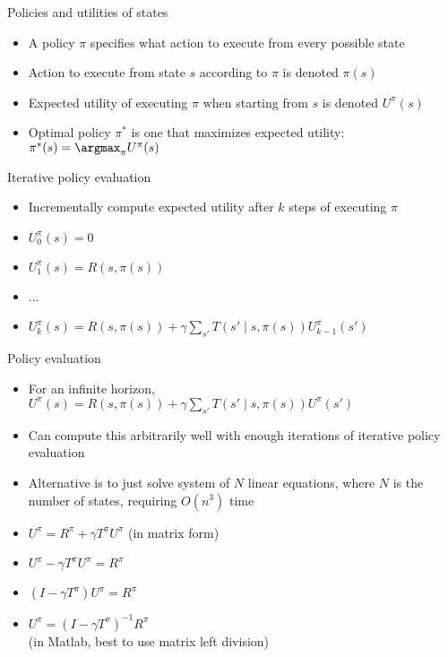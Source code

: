 \documentclass[handout]{dmu}
\begin{document}
\begin{frame}{Policies and utilities of states}
\begin{itemize}
\item<1-> A \alert<1>{policy} $\pi$ specifies what action to execute from every possible state
\item<2-> Action to execute from state $s$ according to $\pi$ is denoted $\pi(s)$
\item<3-> Expected utility of executing $\pi$ when starting from $s$ is denoted $U^\pi(s)$
\item<4-> Optimal policy $\pi^*$ is one that maximizes expected utility: $\pi^*(s) = \argmax_\pi U^\pi(s)$
\end{itemize}
\end{frame}
\clearfoot

\begin{frame}{Iterative policy evaluation}
\begin{itemize}
\item<1-> Incrementally compute expected utility after $k$ steps of executing $\pi$
\item<2-> $U_0^\pi(s) = 0$
\item<3-> $U_1^\pi(s) = R(s, \pi(s))$
\item<4-> ...
\item<5-> $U_k^\pi(s) = R(s, \pi(s)) + \gamma \sum_{s'} T(s' \mid s, \pi(s)) U_{k-1}^\pi(s')$
\end{itemize}
\vfill
{}
\end{frame}

\begin{frame}{Policy evaluation}
\begin{itemize}
\item<1-> For an infinite horizon,\\$U^\pi(s) = R(s, \pi(s)) + \gamma \sum_{s'} T(s' \mid s, \pi(s)) U^\pi(s')$
\item<2-> Can compute this arbitrarily well with enough iterations of iterative policy evaluation
\item<3-> Alternative is to just solve system of $N$ linear equations, where $N$ is the number of states, requiring $O(n^3)$ time
\item<4-> $U^\pi = R^\pi + \gamma T^\pi U^\pi$ (in matrix form)
\item<5-> $U^\pi - \gamma T^\pi U^\pi = R^\pi$
\item<6-> $(I - \gamma T^\pi) U^\pi = R^\pi$
\item<7-> $U^\pi = (I - \gamma T^\pi)^{-1}R^\pi$ \\ (in Matlab, best to use matrix left division)
\end{itemize}
\end{frame}
\end{document}
